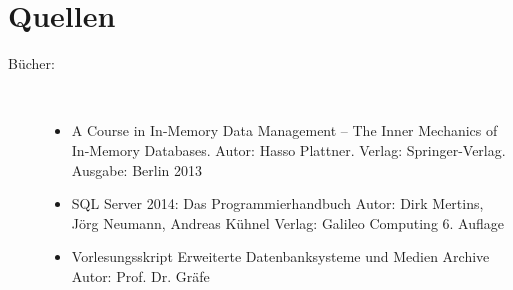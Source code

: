 \documentclass[a4paper, 12pt]{scrartcl}
\begin{document}
\newpage

\section{Quellen}
\begin{description}
	\item[Bücher:]~\par 
	\begin{itemize}
		\item A Course in In-Memory Data Management – The Inner Mechanics of In-Memory Databases. Autor: Hasso Plattner. Verlag: Springer-Verlag. Ausgabe: Berlin 2013
		\item SQL Server 2014: Das Programmierhandbuch Autor: Dirk Mertins, Jörg Neumann, Andreas Kühnel Verlag: Galileo Computing 6. Auflage
		\item Vorlesungsskript Erweiterte Datenbanksysteme und Medien Archive Autor: Prof. Dr. Gräfe  
	\end{itemize}
\end{description}
\end{document}
